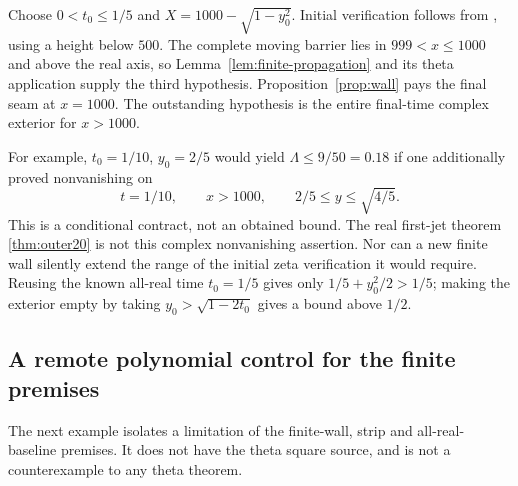 Choose $0<t_0\le1/5$ and $X=1000-\sqrt{1-y_0^2}$.
Initial verification follows from \cite[Theorem 1]{PlattTrudgian},
using a height below $500$. The complete moving barrier lies in
$999<x\le1000$ and above the real axis, so
Lemma~\ref{lem:finite-propagation} and its theta application supply
the third hypothesis. Proposition~\ref{prop:wall} pays the
final seam at $x=1000$. The outstanding hypothesis is the
entire final-time complex exterior for $x>1000$.

For example, $t_0=1/10$, $y_0=2/5$ would yield
$\Lambda\le9/50=0.18$ if one additionally proved nonvanishing on
\[
 t=1/10,\qquad x>1000,\qquad 2/5\le y\le\sqrt{4/5}.
\]
This is a conditional contract, not an obtained bound.
The real first-jet theorem \ref{thm:outer20} is not this complex
nonvanishing assertion. Nor can a new finite wall silently extend
the range of the initial zeta verification it would require.
Reusing the known all-real time $t_0=1/5$ gives only
$1/5+y_0^2/2>1/5$; making the exterior empty by taking
$y_0>\sqrt{1-2t_0}$ gives a bound above $1/2$.

\subsection{A remote polynomial control for the finite premises}

The next example isolates a limitation of the finite-wall, strip and
all-real-baseline premises. It does not have the theta square source,
and is not a counterexample to any theta theorem.

